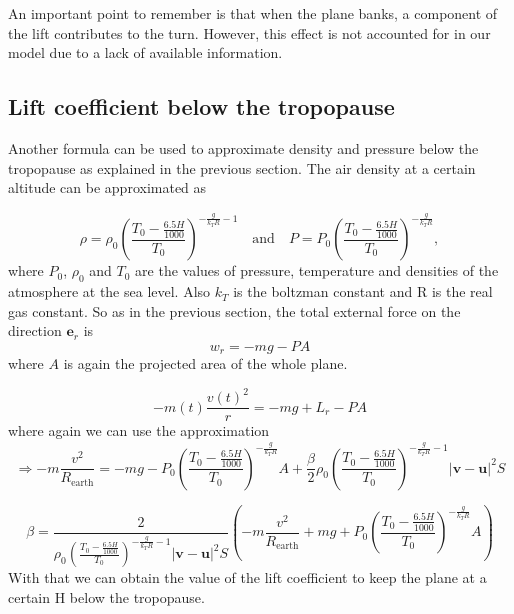 \documentclass{article}
\renewcommand{\vec}[1]{\boldsymbol{#1}}
\begin{document}
An important point to remember is that when the plane banks, a component of the lift contributes to the turn. However, this effect is not accounted for in our model due to a lack of available information.

\subsection{Lift coefficient below the tropopause}

Another formula can be used to approximate density and pressure below the tropopause as explained in the previous section. The air density at a certain altitude can be approximated as \cite{nuic2004bada}

\begin{equation}
    \rho= \rho_0 \left(\frac{T_0-\frac{6.5H}{1000}}{T_0}\right)^{-\frac{g}{k_TR}-1} \quad \text{and} \quad P=P_0\left(\frac{T_0-\frac{6.5H}{1000}}{T_0}\right)^{-\frac{g}{k_TR}},
\end{equation} 
where $P_0$, $\rho_0$ and $T_0$ are the values of pressure, temperature and densities of the atmosphere at the sea level. Also $k_T$ is the boltzman constant and R is the real gas constant.
So as in the previous section, the total external force on the direction $\vec{e}_r$ is 
\begin{equation}
    w_r=-mg -PA 
\end{equation}
where $A$ is again the projected area of the whole plane.

\begin{equation}
    -m(t)\frac{v(t)^2}{r}=-mg+ L_r -PA
\end{equation}
where again we can use the approximation
\begin{equation}
  \Rightarrow  -m\frac{v^2}{R_{\text{earth}}}= -mg- P_0\left(\frac{T_0-\frac{6.5H}{1000}}{T_0}\right)^{-\frac{g}{k_TR}}A +\frac{\beta }{2}\rho_0 \left(\frac{T_0-\frac{6.5H}{1000}}{T_0}\right)^{-\frac{g}{k_TR}-1} |\vec{v}- \vec{u}|^2S
\end{equation}

\begin{equation}
\beta= \frac{2}{\rho_0 \left(\frac{T_0-\frac{6.5H}{1000}}{T_0}\right)^{-\frac{g}{k_TR}-1} |\vec{v}- \vec{u}|^2S} \left(-m\frac{v^2}{R_{\text{earth}}} + mg+ P_0\left(\frac{T_0-\frac{6.5H}{1000}}{T_0}\right)^{-\frac{g}{k_TR}}A \right)
\end{equation}
With that we can obtain the value of the lift coefficient to keep the plane at a certain H below the tropopause.
\printbibliography
\end{document}
